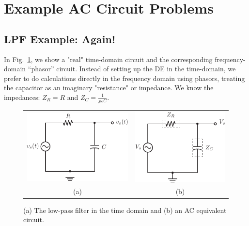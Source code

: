 \section{Example AC Circuit Problems}
\subsection{LPF Example: Again!}
In Fig.~\ref{fig:lpfagain}, we show a "real"  time-domain circuit and the corresponding frequency-domain “phasor” circuit.   Instead of setting up the DE in the time-domain, we prefer to do calculations directly in the frequency domain using phasors, treating the capacitor as an imaginary "resistance" or impedance.  We know the impedances: ${Z_R} = R $ and $ {Z_C} = \frac{1}{{j\omega C}}$.
\begin{figure}[tb]
\begin{center}
\begin{tabular}{cc}
\includegraphics[angle=-0.0,scale=1]{mod1_3_5_rc_lpf} &
\includegraphics[angle=-0.0,scale=1]{mod1_3_6_rc_lpf_Z} \\
(a) & (b) \\
\end{tabular}
\end{center}
\caption{(a) The low-pass filter in the time domain and (b) an AC equivalent circuit.} \label{fig:lpfagain}
\end{figure}
